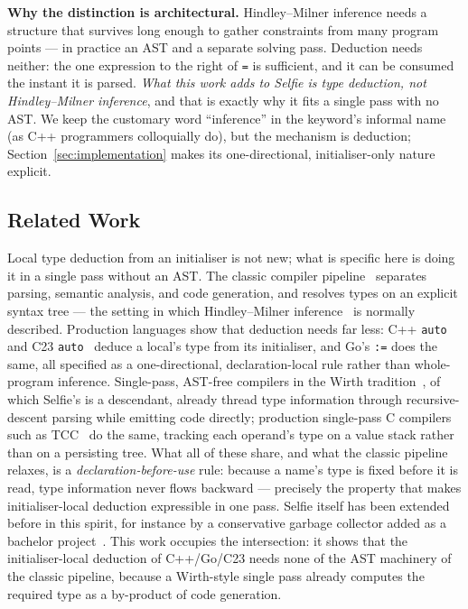 \documentclass[a4paper,11pt]{article}
\begin{document}
\textbf{Why the distinction is architectural.} Hindley--Milner inference needs a structure that survives long enough to gather constraints from many program points --- in practice an AST and a separate solving pass. Deduction needs neither: the one expression to the right of \texttt{=} is sufficient, and it can be consumed the instant it is parsed. \emph{What this work adds to Selfie is type deduction, not Hindley--Milner inference}, and that is exactly why it fits a single pass with no AST. We keep the customary word ``inference'' in the keyword's informal name (as C++ programmers colloquially do), but the mechanism is deduction; Section~\ref{sec:implementation} makes its one-directional, initialiser-only nature explicit.

\subsection{Related Work}
\label{sec:related}

Local type deduction from an initialiser is not new; what is specific here is doing it in a single pass without an AST. The classic compiler pipeline~\cite{dragonbook} separates parsing, semantic analysis, and code generation, and resolves types on an explicit syntax tree --- the setting in which Hindley--Milner inference~\cite{hindleymilner} is normally described. Production languages show that deduction needs far less: C++ \texttt{auto}~\cite{cppstd} and C23 \texttt{auto}~\cite{c23} deduce a local's type from its initialiser, and Go's \texttt{:=} does the same, all specified as a one-directional, declaration-local rule rather than whole-program inference. Single-pass, AST-free compilers in the Wirth tradition~\cite{wirth}, of which Selfie's is a descendant, already thread type information through recursive-descent parsing while emitting code directly; production single-pass C compilers such as TCC~\cite{tcc} do the same, tracking each operand's type on a value stack rather than on a persisting tree. What all of these share, and what the classic pipeline relaxes, is a \emph{declaration-before-use} rule: because a name's type is fixed before it is read, type information never flows backward --- precisely the property that makes initialiser-local deduction expressible in one pass. Selfie itself has been extended before in this spirit, for instance by a conservative garbage collector added as a bachelor project~\cite{bachinger}. This work occupies the intersection: it shows that the initialiser-local deduction of C++/Go/C23 needs none of the AST machinery of the classic pipeline, because a Wirth-style single pass already computes the required type as a by-product of code generation.
\end{document}
